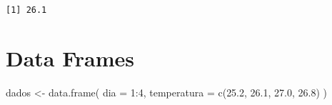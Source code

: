 \documentclass[
  letterpaper,
  DIV=11,
  numbers=noendperiod]{scrreprt}
\newenvironment{Shaded}{\begin{snugshade}}{\end{snugshade}}
\newcommand{\AttributeTok}[1]{\textcolor[rgb]{0.40,0.45,0.13}{#1}}
\newcommand{\DecValTok}[1]{\textcolor[rgb]{0.68,0.00,0.00}{#1}}
\newcommand{\FloatTok}[1]{\textcolor[rgb]{0.68,0.00,0.00}{#1}}
\newcommand{\FunctionTok}[1]{\textcolor[rgb]{0.28,0.35,0.67}{#1}}
\newcommand{\NormalTok}[1]{\textcolor[rgb]{0.00,0.23,0.31}{#1}}
\newcommand{\OtherTok}[1]{\textcolor[rgb]{0.00,0.23,0.31}{#1}}
\newcommand{\SpecialCharTok}[1]{\textcolor[rgb]{0.37,0.37,0.37}{#1}}
\begin{document}
\begin{verbatim}
[1] 26.1
\end{verbatim}

\section{Data Frames}\label{data-frames}

\begin{Shaded}
\begin{Highlighting}[]
\NormalTok{dados }\OtherTok{\textless{}{-}} \FunctionTok{data.frame}\NormalTok{(}
  \AttributeTok{dia =} \DecValTok{1}\SpecialCharTok{:}\DecValTok{4}\NormalTok{,}
  \AttributeTok{temperatura =} \FunctionTok{c}\NormalTok{(}\FloatTok{25.2}\NormalTok{, }\FloatTok{26.1}\NormalTok{, }\FloatTok{27.0}\NormalTok{, }\FloatTok{26.8}\NormalTok{)}
\NormalTok{)}
\end{Highlighting}
\end{Shaded}
\end{document}
